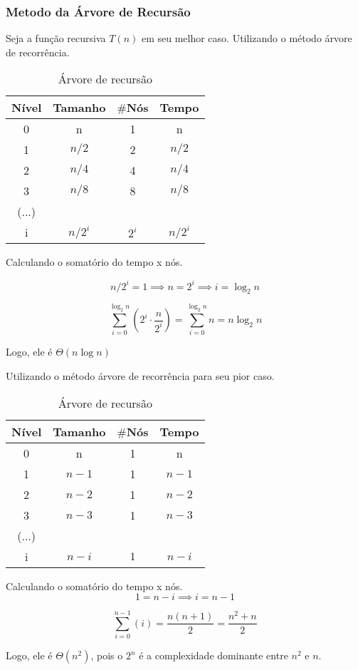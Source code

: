 \subsubsection{Metodo da Árvore de Recursão}
Seja a função recursiva $T(n)$ em seu melhor caso. Utilizando o método árvore de recorrência.

\begin{table}[ht!]
    \centering
    \begin{tabular}{|c|c|c|c|}
    \hline
    \textbf{Nível} & \textbf{Tamanho} & $\#$\textbf{Nós} & \textbf{Tempo} \\ \hline
     0 & n & 1 & n \\ \hline
     1 & $n/2$ & 2 & $n/2$ \\ \hline
     2 & $n/4$ & 4 & $n/4$ \\ \hline
     3 & $n/8$ & 8 & $n/8$ \\ \hline
     (...) & & & \\ \hline
     i & $n/2^i$ & $2^i$ & $n/2^i$ \\ \hline 
    \end{tabular}  
    \caption{Árvore de recursão}
\end{table}

Calculando o somatório do tempo x nós.

\[
n/2^i = 1 \implies n = 2^i \implies i = \log_2{n}
\]

\[
\sum_{i=0}^{\log_2{n}} \left(2^i \cdot \dfrac{n}{2^i}\right) = \sum_{i=0}^{\log_2{n}} n = n \log_2{n}
\]

Logo, ele é $\Theta (n \log{n})$

\bigskip

Utilizando o método árvore de recorrência para seu pior caso.


\begin{table}[ht!]
    \centering
    \begin{tabular}{|c|c|c|c|}
    \hline
    \textbf{Nível} & \textbf{Tamanho} & $\#$\textbf{Nós} & \textbf{Tempo} \\ \hline
     0 & n & 1 & n \\ \hline
     1 & $n - 1$ & 1 & $n - 1$ \\ \hline
     2 & $n - 2$ & 1 & $n - 2$ \\ \hline
     3 & $n - 3$ & 1 & $n - 3$ \\ \hline
     (...) & & & \\ \hline
     i & $n - i$ & $1$ & $n - i$ \\ \hline 
    \end{tabular}  
    \caption{Árvore de recursão}
\end{table}

Calculando o somatório do tempo x nós. 
\[
1 = n -i \implies i = n - 1
\]

\[
\sum_{i = 0}^{n - 1} \left(i\right) = \frac{n \left(n + 1\right)}{2}= \frac{n^2 + n}{2}
\]

Logo, ele é $\Theta (n^2)$, pois o $2^n$ é a complexidade dominante entre $n^2$ e $n$.
